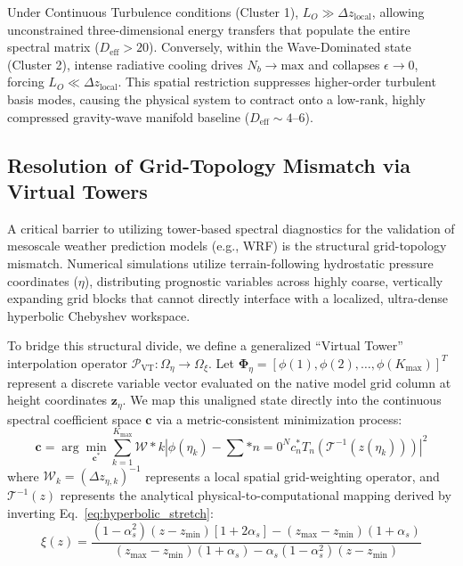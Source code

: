 \documentclass[11pt,a4paper]{article}
\begin{document}
Under Continuous Turbulence conditions (Cluster 1), $L_O \gg \Delta z_{\text{local}}$, allowing unconstrained three-dimensional energy transfers that populate the entire spectral matrix ($D_{\mathrm{eff}} > 20$). Conversely, within the Wave-Dominated state (Cluster 2), intense radiative cooling drives $N_b \to \text{max}$ and collapses $\epsilon \to 0$, forcing $L_O \ll \Delta z_{\text{local}}$. This spatial restriction suppresses higher-order turbulent basis modes, causing the physical system to contract onto a low-rank, highly compressed gravity-wave manifold baseline ($D_{\mathrm{eff}} \sim 4$--$6$).

\subsection{Resolution of Grid-Topology Mismatch via Virtual Towers}
\label{sec:extensions:virtual_tower}

A critical barrier to utilizing tower-based spectral diagnostics for the validation of mesoscale weather prediction models (e.g., WRF) is the structural grid-topology mismatch. Numerical simulations utilize terrain-following hydrostatic pressure coordinates ($\eta$), distributing prognostic variables across highly coarse, vertically expanding grid blocks that cannot directly interface with a localized, ultra-dense hyperbolic Chebyshev workspace.

To bridge this structural divide, we define a generalized ``Virtual Tower'' interpolation operator $\mathcal{P}_{\text{VT}}: \Omega_{\eta} \to \Omega_{\xi}$. Let $\mathbf{\Phi}_{\eta} = [\phi(1), \phi(2), \dots, \phi(K_{\max})]^T$ represent a discrete variable vector evaluated on the native model grid column at height coordinates $\mathbf{z}_{\eta}$. We map this unaligned state directly into the continuous spectral coefficient space $\mathbf{c}$ via a metric-consistent minimization process:
\begin{equation}
\mathbf{c} = \arg\min_{\mathbf{c}^*} \sum_{k=1}^{K_{\max}} \mathcal{W}*k \left| \phi(\eta_k) - \sum*{n=0}^{N} c_n^* T_n\left(\mathcal{T}^{-1}(z(\eta_k))\right) \right|^2
\label{eq:virtual_tower_opt}
\end{equation}
where $\mathcal{W}_k = (\Delta z_{\eta, k})^{-1}$ represents a local spatial grid-weighting operator, and $\mathcal{T}^{-1}(z)$ represents the analytical physical-to-computational mapping derived by inverting Eq.~\ref{eq:hyperbolic_stretch}:
\begin{equation}
\xi(z) = \frac{(1 - \alpha_s^2)(z - z_{\min}) [1 + 2\alpha_s] - (z_{\max} - z_{\min})(1 + \alpha_s)}{(z_{\max} - z_{\min})(1 + \alpha_s) - \alpha_s(1 - \alpha_s^2)(z - z_{\min})}
\label{eq:inverse_stretch}
\end{equation}
\end{document}
